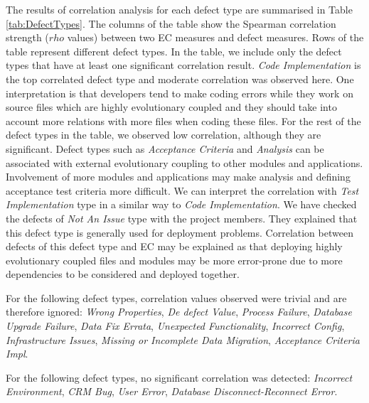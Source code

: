 \documentclass[times]{smrauth}
\begin{document}
The results of correlation analysis for each defect type are summarised in Table \ref{tab:DefectTypes}. The columns of the table show the Spearman correlation strength ($rho$ values) between two EC measures and defect measures. Rows of the table represent different defect types. In the table, we include only the defect types that have at least one significant correlation result. \textit{Code Implementation} is the top correlated defect type and moderate correlation was observed here. One interpretation is that developers tend to make coding errors while they work on source files which are highly evolutionary coupled and they should take into account more relations with more files when coding these files. For the rest of the defect types in the table, we observed low correlation, although they are significant. Defect types such as \textit{Acceptance Criteria} and \textit{Analysis} can be associated with external evolutionary coupling to other modules and applications. Involvement of more modules and applications may make analysis and defining acceptance test criteria more difficult. We can interpret the correlation with \textit{Test Implementation} type in a similar way to \textit{Code Implementation}. We have checked the defects of \textit{Not An Issue} type with the project members. They explained that this defect type is generally used for deployment problems. Correlation between defects of this defect type and EC may be explained as that deploying highly evolutionary coupled files and modules may be more error-prone due to more dependencies to be considered and deployed together.


For the following defect types, correlation values observed were trivial and are therefore ignored: \textit{Wrong Properties}, \textit{De defect  Value}, \textit{Process Failure}, \textit{Database Upgrade Failure}, \textit{Data Fix Errata}, \textit{Unexpected Functionality}, \textit{Incorrect Config}, \textit{Infrastructure Issues}, \textit{Missing or Incomplete Data Migration}, \textit{Acceptance Criteria Impl}.

For the following defect types, no significant correlation was detected: \textit{Incorrect Environment}, \textit{CRM Bug}, \textit{User Error}, \textit{Database Disconnect-Reconnect Error}.
\end{document}
